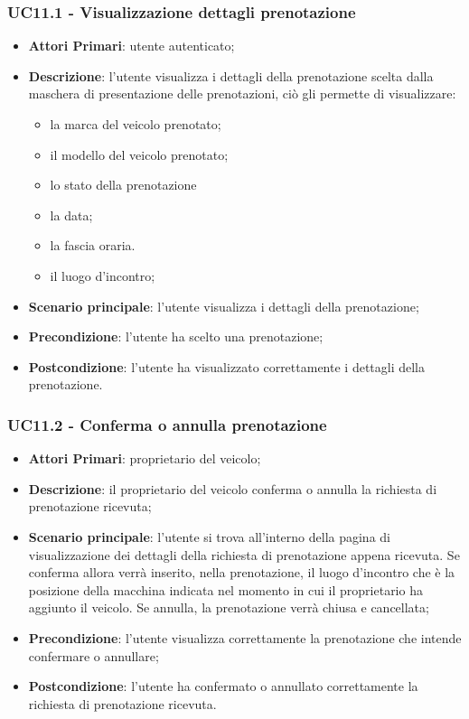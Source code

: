  \subsubsection{UC11.1 - Visualizzazione dettagli prenotazione}
\begin{itemize}
	\item \textbf{Attori Primari}: utente autenticato;
	\item \textbf{Descrizione}: l'utente visualizza i dettagli della prenotazione scelta dalla maschera di presentazione delle prenotazioni, ciò gli permette di visualizzare:
	\begin{itemize}
		\item la marca del veicolo prenotato;
		\item il modello del veicolo prenotato;
		\item lo stato della prenotazione
		\item la data;
		\item la fascia oraria.	
		\item il luogo d'incontro;
	\end{itemize}
	\item \textbf{Scenario principale}: l'utente visualizza i dettagli della prenotazione;	
	\item \textbf{Precondizione}: l'utente ha scelto una prenotazione;
	\item \textbf{Postcondizione}: l'utente ha visualizzato correttamente i dettagli della prenotazione.
\end{itemize}
\subsubsection{UC11.2 - Conferma o annulla prenotazione}
\begin{itemize}
	\item \textbf{Attori Primari}: proprietario del veicolo;
	\item \textbf{Descrizione}: il proprietario del veicolo conferma o annulla la richiesta di prenotazione ricevuta;
	\item \textbf{Scenario principale}: l'utente si trova all'interno della pagina di visualizzazione dei dettagli della richiesta di prenotazione appena ricevuta. Se conferma allora verrà inserito, nella prenotazione, il luogo d'incontro che è la posizione della macchina indicata nel momento in cui il proprietario ha aggiunto il veicolo.\newline
	Se annulla, la prenotazione verrà chiusa e cancellata;
	\item \textbf{Precondizione}: l'utente visualizza correttamente la prenotazione che intende confermare o annullare;
	\item \textbf{Postcondizione}: l'utente ha confermato o annullato correttamente la richiesta di prenotazione ricevuta.
\end{itemize}
